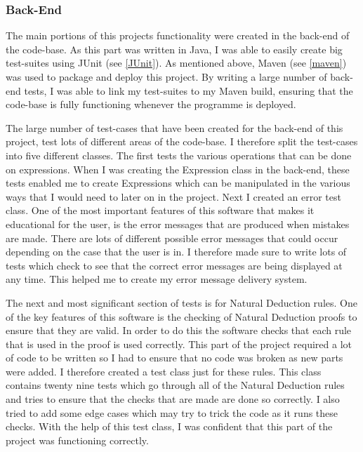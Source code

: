 \subsubsection{Back-End}
The main portions of this projects functionality were created in the back-end of the code-base. As this part was written in Java, I was able to easily create big test-suites using JUnit (see \ref{JUnit}). As mentioned above, Maven (see \ref{maven}) was used to package and deploy this project. By writing a large number of back-end tests, I was able to link my test-suites to my Maven build, ensuring that the code-base is fully functioning whenever the programme is deployed.

The large number of test-cases that have been created for the back-end of this project, test lots of different areas of the code-base. I therefore split the test-cases into five different classes. The first tests the various operations that can be done on expressions. When I was creating the Expression class in the back-end, these tests enabled me to create Expressions which can be manipulated in the various ways that I would need to later on in the project. Next I created an error test class. One of the most important features of this software that makes it educational for the user, is the error messages that are produced when mistakes are made. There are lots of different possible error messages that could occur depending on the case that the user is in. I therefore made sure to write lots of tests which check to see that the correct error messages are being displayed at any time. This helped me to create my error message delivery system. 

The next and most significant section of tests is for Natural Deduction rules. One of the key features of this software is the checking of Natural Deduction proofs to ensure that they are valid. In order to do this the software checks that each rule that is used in the proof is used correctly. This part of the project required a lot of code to be written so I had to ensure that no code was broken as new parts were added. I therefore created a test class just for these rules. This class contains twenty nine tests which go through all of the Natural Deduction rules and tries to ensure that the checks that are made are done so correctly. I also tried to add some edge cases which may try to trick the code as it runs these checks. With the help of this test class, I was confident that this part of the project was functioning correctly.

